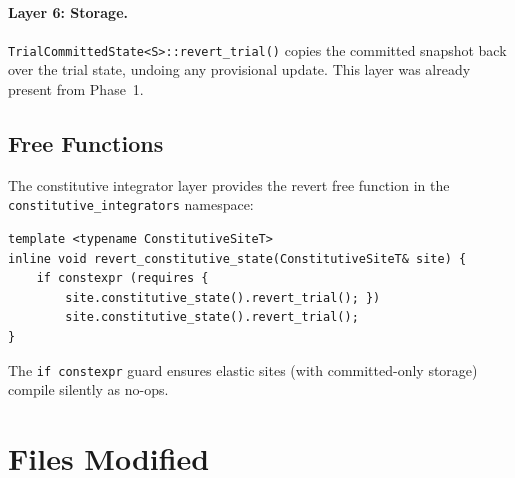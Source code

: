 \paragraph{Layer 6: Storage.}
\texttt{TrialCommittedState<S>::revert\_trial()} copies the committed
snapshot back over the trial state, undoing any provisional update.
This layer was already present from Phase~1.

\subsection{Free Functions}

The constitutive integrator layer provides the revert free function in
the \texttt{constitutive\_integrators} namespace:

\begin{lstlisting}
template <typename ConstitutiveSiteT>
inline void revert_constitutive_state(ConstitutiveSiteT& site) {
    if constexpr (requires {
        site.constitutive_state().revert_trial(); })
        site.constitutive_state().revert_trial();
}
\end{lstlisting}

The \texttt{if constexpr} guard ensures elastic sites (with
committed-only storage) compile silently as no-ops.

\section{Files Modified}
\label{sec:files-modified}

